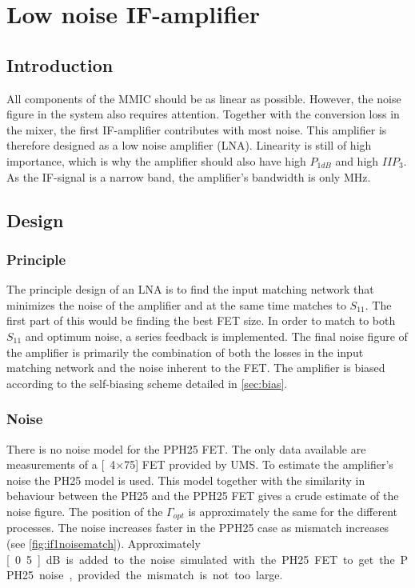 	\section{Low noise IF-amplifier}
		\subsection{Introduction}
			All components of the MMIC should be as linear as possible. However, the noise figure in the system also requires attention. Together with the conversion loss in the mixer, the first IF-amplifier contributes with  most noise. This amplifier is therefore designed as a low noise amplifier (LNA). Linearity is still of high importance, which is why the amplifier should also have high $P_{1dB}$ and high $IIP_3$. As the IF-signal is a narrow band, the amplifier's bandwidth is only \unit[20]{MHz}.

		\subsection{Design}
			\subsubsection{Principle}
				The principle design of an LNA is to find the input matching network that minimizes the noise of the amplifier and at the same time matches to $S_{11}$. The first part of this would be finding the best FET size. In order to match to both $S_{11}$ and optimum noise, a series feedback is implemented.\autocite{lehmann85} The final noise figure of the amplifier is primarily the combination of both the losses in the input matching network and the noise inherent to the FET. The amplifier is biased according to the self-biasing scheme detailed in \autoref{sec:bias}.

			\subsubsection{Noise}\label{sec:if1noise}
				There is no noise model for the PPH25 FET. The only data available are measurements of a \unit[4$\times$75]{\mum} FET provided by UMS. To estimate the amplifier's noise the PH25 model is used. This model together with the similarity in behaviour between the PH25 and the PPH25 FET gives a crude estimate of the noise figure. The position of the $\Gamma_{opt}$ is approximately the same for the different processes. The noise increases faster in the PPH25 case as mismatch increases (see \autoref{fig:if1noisematch}). Approximately \unit[0.5]{dB} is added to the noise simulated with the PH25 FET to get the PPH25 noise, provided the mismatch is not too large.

